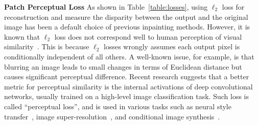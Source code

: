 \begin{table}[h!]
\begin{center}

  \end{center}
  \caption{Comparison of training losses in different methods.}
  \vspace{-10pt}
  \label{table:losses}
\end{table}

\noindent\textbf{Patch Perceptual Loss} As shown in Table~\ref{table:losses}, using $\ell_2$ loss for reconstruction and measure the disparity between the output and the original image has been a default choice of previous inpainting methods. However, it is known that $\ell_2$ loss does not correspond well to human perception of visual similarity~\cite{zhang2018unreasonable}. This is because $\ell_2$ losses wrongly assumes each output pixel is conditionally independent of all others. A well-known issue, for example, is that blurring an image leads to small changes in terms of Euclidean distance but causes significant perceptual difference. Recent research suggests that a better metric for perceptual similarity is the internal activations of deep convolutional networks, usually trained on a high-level image classification task. Such loss is called ``perceptual loss'', and is used in various tasks such as neural style transfer~\cite{gatys2016image}, image super-resolution~\cite{johnson2016perceptual}, and conditional image synthesis~\cite{dosovitskiy2016generating,chen2017photographic}.

